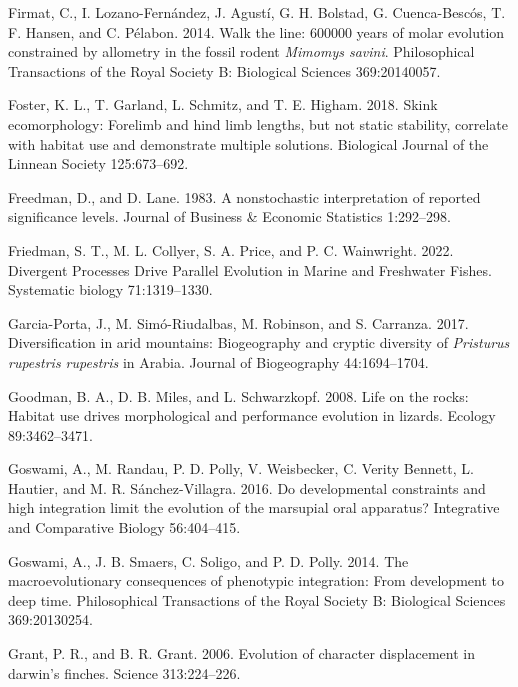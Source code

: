 \documentclass[
  11pt,
]{article}
\begin{document}
\leavevmode\hypertarget{ref-Firmat2014}{}%
Firmat, C., I. Lozano-Fernández, J. Agustí, G. H. Bolstad, G.
Cuenca-Bescós, T. F. Hansen, and C. Pélabon. 2014. Walk the line: 600000
years of molar evolution constrained by allometry in the fossil rodent
\emph{Mimomys savini}. Philosophical Transactions of the Royal Society
B: Biological Sciences 369:20140057.

\leavevmode\hypertarget{ref-Foster2018}{}%
Foster, K. L., T. Garland, L. Schmitz, and T. E. Higham. 2018. Skink
ecomorphology: Forelimb and hind limb lengths, but not static stability,
correlate with habitat use and demonstrate multiple solutions.
Biological Journal of the Linnean Society 125:673--692.

\leavevmode\hypertarget{ref-Freedman1983}{}%
Freedman, D., and D. Lane. 1983. A nonstochastic interpretation of
reported significance levels. Journal of Business \& Economic Statistics
1:292--298.

\leavevmode\hypertarget{ref-Friedman2022}{}%
Friedman, S. T., M. L. Collyer, S. A. Price, and P. C. Wainwright. 2022.
Divergent Processes Drive Parallel Evolution in Marine and Freshwater
Fishes. Systematic biology 71:1319--1330.

\leavevmode\hypertarget{ref-Garcia-Porta2017}{}%
Garcia-Porta, J., M. Simó-Riudalbas, M. Robinson, and S. Carranza. 2017.
Diversification in arid mountains: Biogeography and cryptic diversity of
\emph{Pristurus rupestris rupestris} in Arabia. Journal of Biogeography
44:1694--1704.

\leavevmode\hypertarget{ref-Goodman2008}{}%
Goodman, B. A., D. B. Miles, and L. Schwarzkopf. 2008. Life on the
rocks: Habitat use drives morphological and performance evolution in
lizards. Ecology 89:3462--3471.

\leavevmode\hypertarget{ref-Goswami2016}{}%
Goswami, A., M. Randau, P. D. Polly, V. Weisbecker, C. Verity Bennett,
L. Hautier, and M. R. Sánchez-Villagra. 2016. Do developmental
constraints and high integration limit the evolution of the marsupial
oral apparatus? Integrative and Comparative Biology 56:404--415.

\leavevmode\hypertarget{ref-Goswami2014}{}%
Goswami, A., J. B. Smaers, C. Soligo, and P. D. Polly. 2014. The
macroevolutionary consequences of phenotypic integration: From
development to deep time. Philosophical Transactions of the Royal
Society B: Biological Sciences 369:20130254.

\leavevmode\hypertarget{ref-Grant2006}{}%
Grant, P. R., and B. R. Grant. 2006. Evolution of character displacement
in darwin's finches. Science 313:224--226.
\end{document}
